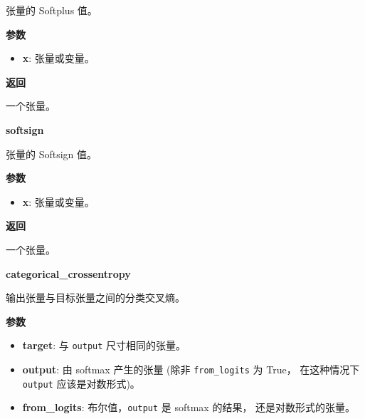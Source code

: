 \begin{Shaded}
\begin{Highlighting}[]
\end{Highlighting}
\end{Shaded}

张量的 Softplus 值。

\textbf{参数}

\begin{itemize}
\tightlist
\item
  \textbf{x}: 张量或变量。
\end{itemize}

\textbf{返回}

一个张量。


\textbf{softsign}\label{softsign}

\begin{Shaded}
\begin{Highlighting}[]
\end{Highlighting}
\end{Shaded}

张量的 Softsign 值。

\textbf{参数}

\begin{itemize}
\tightlist
\item
  \textbf{x}: 张量或变量。
\end{itemize}

\textbf{返回}

一个张量。


\textbf{categorical\_crossentropy}\label{categoricalux5fcrossentropy}

\begin{Shaded}
\begin{Highlighting}[]
\OperatorTok{=}\NormalTok{)}
\end{Highlighting}
\end{Shaded}

输出张量与目标张量之间的分类交叉熵。

\textbf{参数}

\begin{itemize}
\tightlist
\item
  \textbf{target}: 与 \texttt{output} 尺寸相同的张量。
\item
  \textbf{output}: 由 softmax 产生的张量 (除非 \texttt{from\_logits} 为
  True， 在这种情况下 \texttt{output} 应该是对数形式)。
\item
  \textbf{from\_logits}: 布尔值，\texttt{output} 是 softmax 的结果，
  还是对数形式的张量。
\end{itemize}

